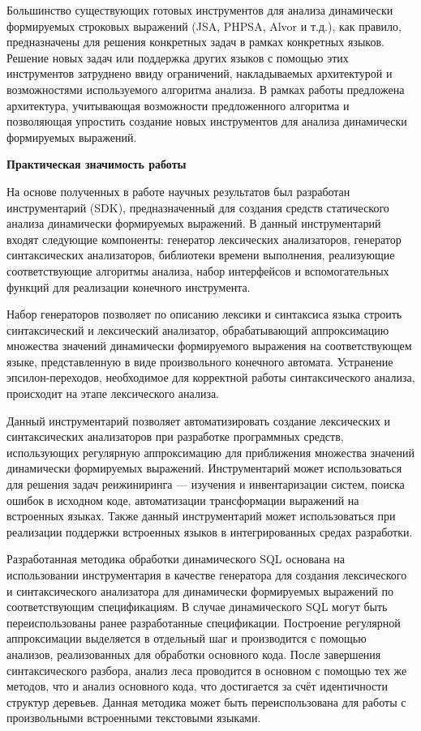Большинство существующих готовых инструментов для анализа динамически формируемых строковых выражений (JSA, PHPSA, Alvor и т.д.), как правило, предназначены для решения конкретных задач в рамках конкретных языков. Решение новых задач или поддержка других языков с помощью этих инструментов затруднено ввиду ограничений, накладываемых архитектурой и возможностями используемого алгоритма анализа. В рамках работы предложена архитектура, учитывающая возможности предложенного алгоритма и позволяющая упростить создание новых инструментов для анализа динамически формируемых выражений.

\textbf{Практическая значимость работы}

На основе полученных в работе научных результатов был разработан инструментарий (SDK), предназначенный для создания средств статического анализа динамически формируемых выражений. В данный инструментарий входят следующие компоненты: генератор лексических анализаторов, генератор синтаксических анализаторов, библиотеки времени выполнения, реализующие соответствующие алгоритмы анализа, набор интерфейсов и вспомогательных функций для реализации конечного инструмента. 

Набор генераторов позволяет по описанию лексики и синтаксиса языка строить синтаксический и лексический анализатор, обрабатывающий аппроксимацию множества значений динамически формируемого выражения на соответствующем языке, представленную в виде произвольного конечного автомата. Устранение эпсилон-переходов, необходимое для корректной работы синтаксического анализа, происходит на этапе лексического анализа.

Данный инструментарий позволяет автоматизировать создание лексических и синтаксических анализаторов при разработке программных средств, использующих регулярную аппроксимацию для приближения множества значений динамически формируемых выражений. Инструментарий может использоваться для решения задач реижиниринга --- изучения и инвентаризации систем, поиска ошибок в исходном коде, автоматизации трансформации выражений на встроенных языках. Также данный инструментарий может использоваться при реализации поддержки встроенных языков в интегрированных средах разработки.

Разработанная методика обработки динамического SQL основана на использовании инструментария в качестве генератора для создания лексического и синтаксического анализатора для динамически формируемых выражений по соответствующим спецификациям. В случае динамического SQL могут быть переиспользованы ранее разработанные спецификации. Построение регулярной аппроксимации выделяется в отдельный шаг и производится с помощью анализов, реализованных для обработки основного кода. После завершения синтаксического разбора, анализ леса проводится в основном с помощью тех же методов, что и анализ основного кода, что достигается за счёт идентичности структур деревьев. Данная методика может быть переиспользована для работы с произвольными встроенными текстовыми языками.

